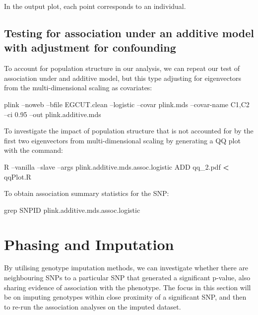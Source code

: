 \documentclass[]{book}
\newenvironment{Shaded}{\begin{snugshade}}{\end{snugshade}}
\newcommand{\FunctionTok}[1]{\textcolor[rgb]{0.00,0.00,0.00}{#1}}
\newcommand{\OperatorTok}[1]{\textcolor[rgb]{0.81,0.36,0.00}{\textbf{#1}}}
\newcommand{\ExtensionTok}[1]{#1}
\newcommand{\NormalTok}[1]{#1}
\begin{document}
In the output plot, each point corresponds to an individual.

\subsection{Testing for association under an additive model with
adjustment for
confounding}\label{testing-for-association-under-an-additive-model-with-adjustment-for-confounding}

To account for population structure in our analysis, we can repeat our
test of association under and additive model, but this type adjusting
for eigenvectors from the multi-dimensional scaling as covariates:

\begin{Shaded}
\begin{Highlighting}[]
\ExtensionTok{plink}\NormalTok{ --noweb --bfile EGCUT.clean --logistic --covar plink.mds --covar-name C1,C2 --ci 0.95 --out plink.additive.mds}
\end{Highlighting}
\end{Shaded}

To investigate the impact of population structure that is not accounted
for by the first two eigenvectors from multi-dimensional scaling by
generating a QQ plot with the command:

\begin{Shaded}
\begin{Highlighting}[]
\ExtensionTok{R}\NormalTok{ --vanilla --slave --args plink.additive.mds.assoc.logistic ADD qq_2.pdf }\OperatorTok{<}\NormalTok{ qqPlot.R}
\end{Highlighting}
\end{Shaded}

To obtain association summary statistics for the SNP:

\begin{Shaded}
\begin{Highlighting}[]
\FunctionTok{grep}\NormalTok{ SNPID plink.additive.mds.assoc.logistic}
\end{Highlighting}
\end{Shaded}

\section{Phasing and Imputation}\label{phasing-and-imputation}

By utilising genotype imputation methods, we can investigate whether
there are neighbouring SNPs to a particular SNP that generated a
significant p-value, also sharing evidence of association with the
phenotype. The focus in this section will be on imputing genotypes
within close proximity of a significant SNP, and then to re-run the
association analyses on the imputed dataset.
\end{document}
